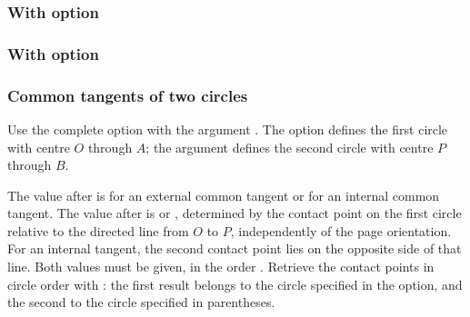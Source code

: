 \subsubsection{With option  } %
\label{sub:altitude}
\begin{tkzexample}[latex=7 cm,small]
\end{tkzexample}



\subsubsection{ With option } %
\label{sub:eulerline}
\begin{tkzexample}[latex=7 cm,small]
\end{tkzexample}

\subsubsection{Common tangents of two circles}

Use the complete option
with the argument . The option defines the first circle with centre
$O$ through $A$; the argument defines the second circle with centre $P$ through $B$.

The value after  is  for an external common tangent or
 for an internal common tangent. The value after  is
 or , determined by the contact point on the first circle
relative to the directed line from $O$ to $P$, independently of the page orientation.
For an internal tangent, the second contact point lies on the opposite side of
that line. Both values must be given, in the order
.
Retrieve the contact points in circle order with :
the first result belongs to the circle specified in the option, and the second
to the circle specified in parentheses.

